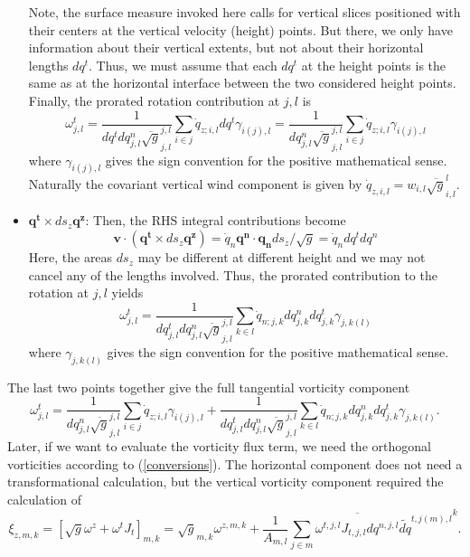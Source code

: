 \begin{itemize}
       Note, the surface measure invoked here calls for vertical slices positioned with their centers at the
       vertical velocity (height) points. But there, we only have information about their vertical extents, but not
       about their horizontal lengths $dq^t$. Thus, we must assume that each $dq^t$ at the height points is the
       same as at the horizontal
       interface between the two considered height points. Finally, the prorated rotation contribution at $j,l$ is
       \begin{displaymath}
        \omega^{t}_{j,l}=\frac{1}{dq^t dq^n_{j,l}\overline{\sqrt{g}}^{j,l}_{j,l}}\sum_{i\in j }\dot{q}_{z;i,l}dq^t
       \gamma_{i(j),l} = \frac{1}{dq^n_{j,l}\overline{\sqrt{g}}^{j,l}_{j,l}}\sum_{i\in j }\dot{q}_{z;i,l}
       \gamma_{i(j),l}
       \end{displaymath}
       where $\gamma_{i(j),l}$ gives the sign convention for the positive mathematical sense. Naturally
       the covariant vertical wind component is given by $\dot{q}_{z,i,l}=w_{i,l}\overline{\sqrt{g}}^{l}_{i,l}$.
 \item $\mathbf{q^t}\times ds_z\mathbf{q^z}$: Then, the RHS integral contributions become
       \begin{displaymath}
       \mathbf{v}\cdot(\mathbf{q^t}\times ds_z\mathbf{q^z})=\dot{q}_n\mathbf{q^n}\cdot\mathbf{q_n}ds_z/\sqrt{g}=
       \dot{q}_n dq^tdq^n
       \end{displaymath}
       Here, the areas $ds_z$ may be different at different height and we may not cancel any of the lengths
       involved. Thus, the prorated contribution to the rotation at $j,l$ yields
       \begin{displaymath}
        \omega^{t}_{j,l}=\frac{1}{dq^t_{j,l}dq^n_{j,l}\overline{\sqrt{g}}^{j,l}_{j,l}}\sum_{k\in l }\dot{q}_{n;j,k}
       dq^n_{j,k}dq^t_{j,k}
       \gamma_{j,k(l)}
       \end{displaymath}
       where $\gamma_{j,k(l)}$ gives the sign convention for the positive mathematical sense.
\end{itemize}
The last two points together give the full tangential vorticity component
\begin{displaymath}
\omega^{t}_{j,l}=\frac{1}{dq^n_{j,l}\overline{\sqrt{g}}^{j,l}_{j,l}}\sum_{i\in j }\dot{q}_{z;i,l}
\gamma_{i(j),l}+\frac{1}{dq^t_{j,l}dq^n_{j,l}\overline{\sqrt{g}}^{j,l}_{j,l}}\sum_{k\in l }
\dot{q}_{n;j,k}dq^n_{j,k}dq^t_{j,k}\gamma_{j,k(l)}.
\end{displaymath}
Later, if we want to evaluate the  vorticity flux term, we need the orthogonal vorticities according
to (\ref{conversions}). The horizontal component does not need a transformational calculation, but
the vertical vorticity component required the calculation of
\begin{displaymath}
{\xi}_{z,m,k}=[\sqrt{g}\omega^z+\omega^tJ_t]_{m,k}=\sqrt{g}_{m,k}\omega^{z,m,k}+
\overline{ \frac{1}{A_{m,l}}\sum_{j\in m}\omega^{t,j,l}J_{t,j,l}dq^{n,j,l}\widetilde{dq}^{t,j(m),l}}^k.
\end{displaymath}
